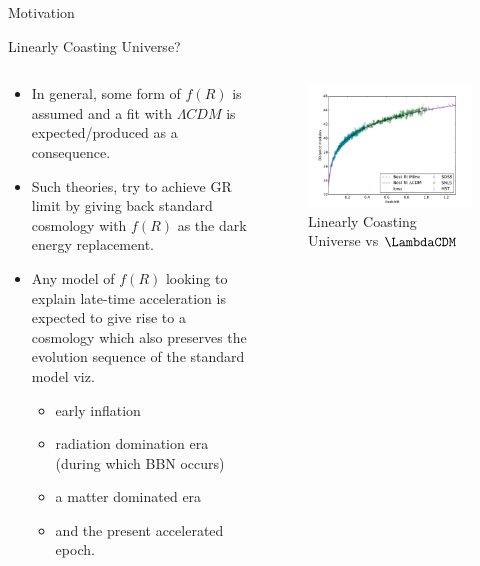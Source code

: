 \documentclass[final,hyperref={pdfpagelabels=false}]{beamer}
\begin{document}
\begin{frame}[t]
\begin{columns}[t]
\begin{column}{.465\textwidth}
\begin{block}{Motivation}
\end{block}


\begin{block}{Linearly Coasting Universe?}

\begin{columns} %
\begin{column}{.54\textwidth} %
\begin{itemize}
	\item In general, some form of $f(R)$ is assumed and a fit with $\Lambda CDM$ is expected/produced as a consequence.
	\item  Such theories, try to achieve GR limit by giving back standard cosmology with $f(R)$ as the dark energy replacement.
	\item Any model of $f(R)$ looking to explain late-time acceleration is expected to give rise to a cosmology which also preserves the evolution sequence of the standard model viz.
	\begin{itemize}
		\item  early inflation
		\item radiation domination era (during which BBN occurs)
		\item a matter dominated era
		\item and the present accelerated epoch.
	\end{itemize}
\end{itemize}
\end{column}

\begin{column}{.43\textwidth} %
\centering
\begin{figure}
\includegraphics[width=0.8\linewidth]{"./figures/Sarkar_fig3a"}
\caption{Linearly Coasting Universe vs $\LambdaCDM$}
\end{figure}
\end{column}
\end{columns} %


\end{block}
\end{column}
\end{columns}
\end{frame}
\end{document}
